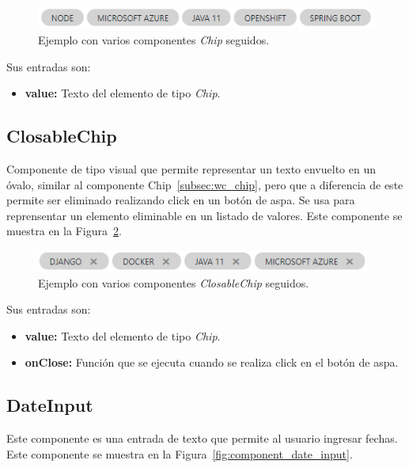 \documentclass[a4paper, 12pt]{book}
\begin{document}
    \begin{figure}
        \centering
        \includegraphics[width=12cm, keepaspectratio]{img/Chip.PNG}
        \caption{Ejemplo con varios componentes \emph{Chip} seguidos.}\label{fig:component_chip}
    \end{figure}

    Sus entradas son:

    \begin{itemize}
        \item \textbf{value:} Texto del elemento de tipo \emph{Chip}.
    \end{itemize}

    \subsection{ClosableChip}
    \label{subsec:wc_closable_chip}
    Componente de tipo visual que permite representar un texto envuelto en un óvalo, similar al componente Chip~\ref{subsec:wc_chip}, pero que a diferencia de este permite ser eliminado realizando click en un botón de aspa.
    Se usa para reprensentar un elemento eliminable en un listado de valores.
    Este componente se muestra en la Figura~\ref{fig:component_closable_chip}.

    \begin{figure}
        \centering
        \includegraphics[width=11cm, keepaspectratio]{img/ClosableChip.PNG}
        \caption{Ejemplo con varios componentes \emph{ClosableChip} seguidos.}\label{fig:component_closable_chip}
    \end{figure}

    Sus entradas son:

    \begin{itemize}
        \item \textbf{value:} Texto del elemento de tipo \emph{Chip}.
        \item \textbf{onClose:} Función que se ejecuta cuando se realiza click en el botón de aspa.
    \end{itemize}

    \subsection{DateInput}
    \label{subsec:wc_date_input}
    Este componente es una entrada de texto que permite al usuario ingresar fechas.
    Este componente se muestra en la Figura~\ref{fig:component_date_input}.
\end{document}
